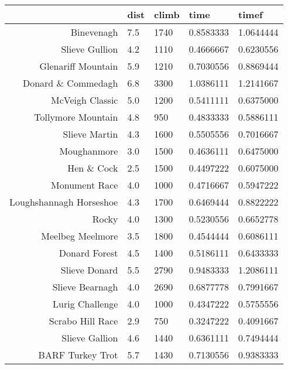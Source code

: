 \documentclass[11pt]{article}
\begin{document}
    \begin{tabular}{r|llll}
  & dist & climb & time & timef\\
\hline
	Binevenagh & 7.5       & 1740      & 0.8583333 & 1.0644444\\
	Slieve Gullion & 4.2       & 1110      & 0.4666667 & 0.6230556\\
	Glenariff Mountain & 5.9       & 1210      & 0.7030556 & 0.8869444\\
	Donard \& Commedagh & 6.8       & 3300      & 1.0386111 & 1.2141667\\
	McVeigh Classic & 5.0       & 1200      & 0.5411111 & 0.6375000\\
	Tollymore Mountain & 4.8       &  950      & 0.4833333 & 0.5886111\\
	Slieve Martin & 4.3       & 1600      & 0.5505556 & 0.7016667\\
	Moughanmore & 3.0       & 1500      & 0.4636111 & 0.6475000\\
	Hen \& Cock & 2.5       & 1500      & 0.4497222 & 0.6075000\\
	Monument Race & 4.0       & 1000      & 0.4716667 & 0.5947222\\
	Loughshannagh Horseshoe & 4.3       & 1700      & 0.6469444 & 0.8822222\\
	Rocky & 4.0       & 1300      & 0.5230556 & 0.6652778\\
	Meelbeg Meelmore & 3.5       & 1800      & 0.4544444 & 0.6086111\\
	Donard Forest & 4.5       & 1400      & 0.5186111 & 0.6433333\\
	Slieve Donard & 5.5       & 2790      & 0.9483333 & 1.2086111\\
	Slieve Bearnagh & 4.0       & 2690      & 0.6877778 & 0.7991667\\
	Lurig Challenge & 4.0       & 1000      & 0.4347222 & 0.5755556\\
	Scrabo Hill Race & 2.9       &  750      & 0.3247222 & 0.4091667\\
	Slieve Gallion & 4.6       & 1440      & 0.6361111 & 0.7494444\\
	BARF Turkey Trot & 5.7       & 1430      & 0.7130556 & 0.9383333\\
\end{tabular}


    
    \begin{center}
    \end{center}
    { \hspace*{\fill} \\}
    
\end{document}
